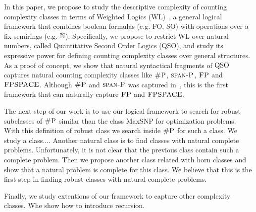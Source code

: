In this paper, we propose to study the descriptive complexity of counting complexity classes in terms of Weighted Logics (WL)~\cite{DrosteG07}, a general logical framework that combines boolean formulas (e.g. FO, SO) with operations over a fix semirings (e.g. $\mathbb{N}$). 
Specifically, we propose to restrict WL over natural numbers, called Quantitative Second Order Logics (QSO), and study its expressive power for defining counting complexity classes over general structures. 
As a proof of concept, we show that natural syntactical fragments of ${\rm QSO}$ captures natural counting complexity classes like $\text{\sc \#P}$, $\text{\sc span-P}$, $\text{\sc FP}$ and $\text{\sc FPSPACE}$.
Although $\text{\sc \#P}$ and $\text{\sc span-P}$ was captured in~\cite{SST95,B95,CG96}, this is the first framework that can naturally capture $\text{\sc FP}$ and $\text{\sc FPSPACE}$.

The next step of our work is to use our logical framework to search for robust subclasses of $\text{\sc \#P}$ similar than the class {\sc MaxSNP} for optimization problems.
With this definition of robust class we search inside $\text{\sc \#P}$ for such a class. 
We study a class.... 
Another natural class is to find classes with natural complete problems.  Unfortunately, it is not clear that the previous class contain such a complete problem. Then we propose another class related with horn classes and show that a natural problem is complete for this class. 
We believe that this is the first step in finding robust classes with natural complete problems. 

Finally, we study extentions of our framework to capture other complexity classes. Whe show how to introduce recursion. 

